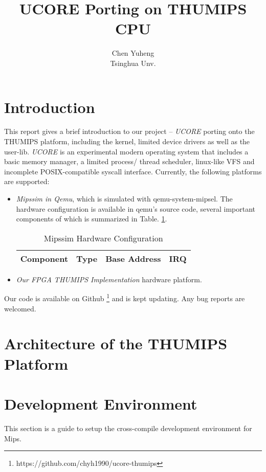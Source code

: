 \documentclass[a4paper]{article}
\begin{document}
\title{UCORE Porting on THUMIPS CPU}
\author{Chen Yuheng\\ Tsinghua Unv.}
\maketitle

\section{Introduction}
This report gives a brief introduction to our project -- 
\emph{UCORE} porting onto the THUMIPS platform, including the kernel, limited
device drivers as well as the user-lib. \emph{UCORE} is an experimental 
modern operating system that includes a basic memory manager, a limited process/
thread scheduler, linux-like VFS and incomplete POSIX-compatible syscall 
interface.  Currently, the following platforms are supported:
 \begin{itemize}
   \item \emph{Mipssim in Qemu}, which is simulated with qemu-system-mipsel.
     The hardware configuration is available in qemu's source code,
     several important components of which is summarized in
     Table. \ref{tab:mipssim}.
     \begin{table}[h]
       \centering
       \begin{tabular}{|r|rrr|}
         \hline
         Component & Type & Base Address &  IRQ \\
         \hline
         \hline
       \end{tabular}
       \caption{Mipssim Hardware Configuration}
       \label{tab:mipssim}
     \end{table}

   \item \emph{Our FPGA THUMIPS Implementation} hardware platform.
 \end{itemize}

Our code is available on Github
\footnote{https://github.com/chyh1990/ucore-thumips}
 and is kept updating. Any bug reports are welcomed.

\section{Architecture of the THUMIPS Platform}

\section{Development Environment}
This section is a guide to setup the cross-compile development environment for
Mips.
\end{document}
